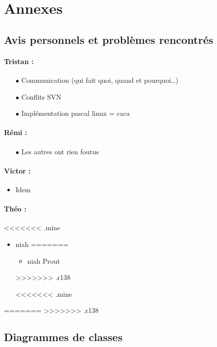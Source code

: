 \section{Annexes}
\subsection{Avis personnels et problèmes rencontrés}
\paragraph{Tristan :}
\begin{itemize}
\item[$\bullet$]Communication (qui fait quoi, quand et pourquoi\dots )
\item[$\bullet$]Conflits SVN
\item[$\bullet$]Implémentation pascal linux = caca
\end{itemize}
\paragraph{Rémi :}
\begin{itemize}
\item[$\bullet$] Les autres ont rien foutus
\end{itemize}
\paragraph{Victor :}
\begin{itemize}
\item Idem
\end{itemize}

\paragraph{Théo :}
<<<<<<< .mine
\begin{itemize}
\item niah
=======
\begin{itemize}
\item niah
\itemindent Prout
\end{itemize}
>>>>>>> .r138

<<<<<<< .mine
\end{itemize}

=======
>>>>>>> .r138
\newpage
\subsection{Diagrammes de classes}

